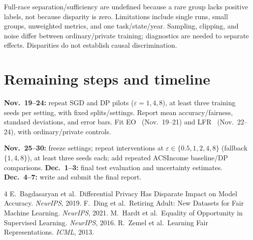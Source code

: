 \documentclass[11pt,letterpaper]{article}
\newcommand{\eps}{\varepsilon}
\begin{document}
Full-race separation/sufficiency are undefined because a rare group lacks positive labels, not because disparity is zero. Limitations include single runs, small groups, unweighted metrics, and one task/state/year. Sampling, clipping, and noise differ between ordinary/private training; diagnostics are needed to separate effects. Disparities do not establish causal discrimination.

\section{Remaining steps and timeline}
\textbf{Nov.\ 19--24:} repeat SGD and DP pilots ($\eps=1,4,8$), at least three training seeds per setting, with fixed splits/settings. Report mean accuracy/fairness, standard deviations, and error bars. Fit EO~\cite{hardt2016} (Nov.\ 19--21) and LFR~\cite{zemel2013} (Nov.\ 22--24), with ordinary/private controls.

\textbf{Nov.\ 25--30:} freeze settings; repeat interventions at $\eps\in\{0.5,1,2,4,8\}$ (fallback $\{1,4,8\}$), at least three seeds each; add repeated ACSIncome baseline/DP comparisons. \textbf{Dec.\ 1--3:} final test evaluation and uncertainty estimates. \textbf{Dec.\ 4--7:} write and submit the final report.

\renewcommand{\refname}{References}
\begin{thebibliography}{4}
\setlength{\itemsep}{0pt}\setlength{\parskip}{0pt}
 E.\ Bagdasaryan et al.\ Differential Privacy Has Disparate Impact on Model Accuracy. \textit{NeurIPS}, 2019.
 F.\ Ding et al.\ Retiring Adult: New Datasets for Fair Machine Learning. \textit{NeurIPS}, 2021.
 M.\ Hardt et al.\ Equality of Opportunity in Supervised Learning. \textit{NeurIPS}, 2016.
 R.\ Zemel et al.\ Learning Fair Representations. \textit{ICML}, 2013.
\end{thebibliography}
\end{document}
